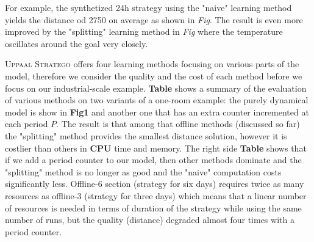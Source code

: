     For example, the synthetized 24h strategy using the "naive" learning method yields
    the distance od 2750 on average as shown in \emph{Fig}. The result is even more improved
    by  the "splitting" learning method in \emph{Fig} where the temperature oscillates around
    the goal very closely.

    \textsc{Uppaal Stratego} offers four learning methods focusing on various parts of the model,
    therefore we consider the quality and the cost of each method before we focus on our 
    industrial-scale example. \textbf{Table} shows a summary of the evaluation of various 
    methods on two variants of a one-room example: the purely dynamical model is show in \textbf{Fig1}
    and another one that has an extra counter incremented at each period $P$. The result
    is that among that offline methods (discussed so far) the "splitting" method provides 
    the smallest distance solution, however it is costlier than others in \textbf{CPU} time
    and memory. The right side \textbf{Table} shows that if we add a period counter to our
    model, then other methods dominate and the "splitting" method is no longer as good and 
    the "naive" computation costs significantly less. Offline-6 section (strategy for six days)
    requires twice as many resources as offline-3 (strategy for three days) which means 
    that a linear number of resources is needed in terms of duration of the strategy while 
    using the same number of runs, but the quality (distance) degraded almost four times
    with a period counter.

    \clearpage

